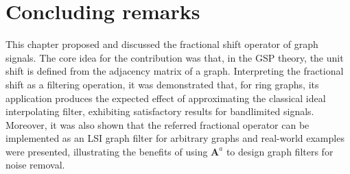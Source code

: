 \section{Concluding remarks}\label{sec:conc}
This chapter proposed and discussed the fractional shift operator of graph signals. The core idea for the contribution was that, in the GSP theory, the unit shift is defined from the adjacency matrix of a graph. Interpreting the fractional shift as a filtering operation, it was demonstrated that, for ring graphs, its application produces the expected effect of approximating the classical ideal interpolating filter, exhibiting satisfactory results for bandlimited signals. Moreover, it was also shown that the referred fractional operator can be implemented as an LSI graph filter for arbitrary graphs and real-world examples were presented, illustrating the benefits of using $\mathbf{A}^a$ to design graph filters for noise removal.
